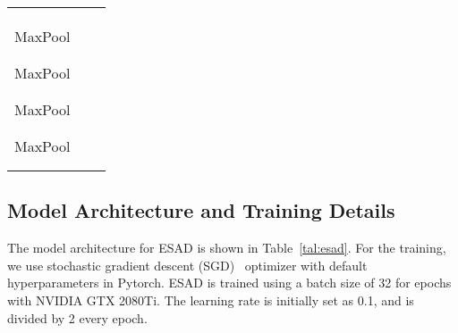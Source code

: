 \documentclass{bmvc2k}
\begin{document}
\begin{table}[h]
{\begin{tabular}{C{1.4cm}C{2.4cm}C{4.0cm}}
       &  & \\ 
      \cmidrule(lr){1-1}\cmidrule(lr){2-2}\cmidrule(lr){3-3}
       &  & \\
       &  & \\ 
      MaxPool &  &  \\
       &  & \\ 
       &  & \\ 
      MaxPool &  &  \\
       &  & \\ 
       &  & \\ 
      MaxPool &  &  \\
       &  & \\ 
       &  & \\ 
      MaxPool &  &  \\
       &  & \\ 
       &  & \\ 
      \bottomrule
    \end{tabular}}
\end{table}

\renewcommand \arraystretch{0.85}
\begin{table}[t]
\centering
\caption{Classic anomaly detection benchmarks~\cite{Rayana2016}.}
\label{tal:dataset}
\small
{}
\end{table}

\subsection{Model Architecture and Training Details} 
The model architecture for ESAD is shown in Table~\ref{tal:esad}. For the training, we use stochastic gradient descent (SGD)~\cite{bottou2010large} optimizer with default hyperparameters in Pytorch. ESAD is trained using a batch size of 32 for  epochs with NVIDIA GTX 2080Ti. The learning rate is initially set as 0.1, and is divided by 2 every  epoch.
\end{document}
